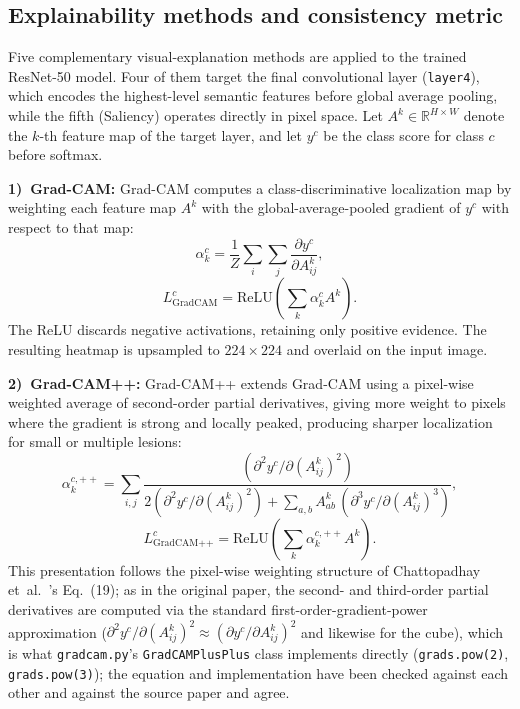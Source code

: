 \subsection{Explainability methods and consistency metric}

Five complementary visual-explanation methods are applied to the trained ResNet-50 model. Four of them target the final convolutional layer (\texttt{layer4}), which encodes the highest-level semantic features before global average pooling, while the fifth (Saliency) operates directly in pixel space. Let $A^k \in \mathbb{R}^{H \times W}$ denote the $k$-th feature map of the target layer, and let $y^c$ be the class score for class $c$ before softmax.

\textbf{1)~Grad-CAM:} Grad-CAM \cite{ref11} computes a class-discriminative localization map by weighting each feature map $A^k$ with the global-average-pooled gradient of $y^c$ with respect to that map:
\begin{equation}
\alpha_k^c = \frac{1}{Z}\sum_i\sum_j \frac{\partial y^c}{\partial A^k_{ij}},
\end{equation}
\begin{equation}
L^c_{\text{GradCAM}} = \mathrm{ReLU}\!\left(\sum_k \alpha_k^c A^k\right).
\end{equation}
The ReLU discards negative activations, retaining only positive evidence. The resulting heatmap is upsampled to $224\times224$ and overlaid on the input image.

\textbf{2)~Grad-CAM++:} Grad-CAM++ \cite{ref12} extends Grad-CAM using a pixel-wise weighted average of second-order partial derivatives, giving more weight to pixels where the gradient is strong and locally peaked, producing sharper localization for small or multiple lesions:
\begin{equation}
\alpha_k^{c,++} = \sum_{i,j} \frac{(\partial^2 y^c / \partial (A^k_{ij})^2)}{2(\partial^2 y^c / \partial (A^k_{ij})^2) + \sum_{a,b} A^k_{ab}\,(\partial^3 y^c / \partial (A^k_{ij})^3)},
\end{equation}
\begin{equation}
L^c_{\text{GradCAM++}} = \mathrm{ReLU}\!\left(\sum_k \alpha_k^{c,++} A^k\right).
\end{equation}
This presentation follows the pixel-wise weighting structure of Chattopadhay et~al.~\cite{ref12}'s Eq.~(19); as in the original paper, the second- and third-order partial derivatives are computed via the standard first-order-gradient-power approximation ($\partial^2 y^c/\partial(A^k_{ij})^2 \approx (\partial y^c/\partial A^k_{ij})^2$ and likewise for the cube), which is what \texttt{gradcam.py}'s \texttt{GradCAMPlusPlus} class implements directly (\texttt{grads.pow(2)}, \texttt{grads.pow(3)}); the equation and implementation have been checked against each other and against the source paper and agree.

